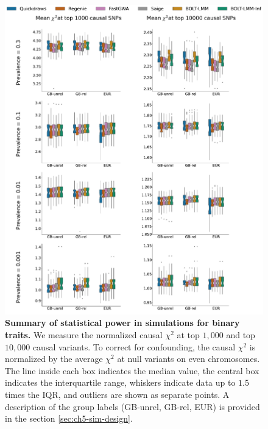 \begin{figure}[h!]
    \centering
    \includegraphics[width=\textwidth]{figures/sim_power/bt_power.pdf}
    
    \caption{\textbf{Summary of statistical power in simulations for binary traits.}
    We measure the normalized causal $\chi^2$ at top $1{,}000$ and top $10{,}000$ causal variants.
    To correct for confounding, the causal $\chi^2$ is normalized by the average $\chi^2$ at null variants on even chromosomes.
    The line inside each box indicates the median value, the central box indicates the interquartile range, whiskers indicate data up to $1.5$ times the IQR, and outliers are shown as separate points.
    A description of the group labels (GB-unrel, GB-rel, EUR) is provided in the section \ref{sec:ch5-sim-design}.
    \label{fig:sim_power_bt}
    }
\end{figure}

